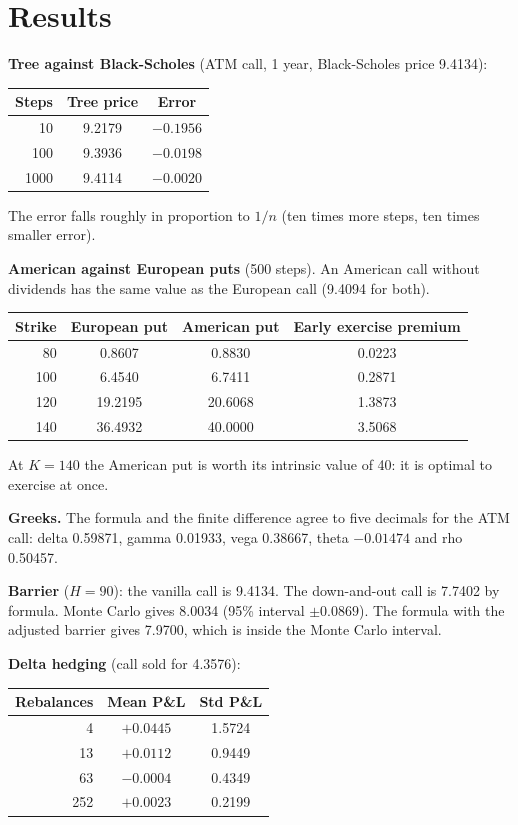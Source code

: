 \documentclass[11pt,a4paper]{article}
\begin{document}
\section{Results}
\textbf{Tree against Black-Scholes} (ATM call, 1 year, Black-Scholes price 9.4134):

\begin{center}
\begin{tabular}{@{}rcc@{}}
\toprule
Steps & Tree price & Error \\
\midrule
10 & 9.2179 & $-0.1956$ \\
100 & 9.3936 & $-0.0198$ \\
1000 & 9.4114 & $-0.0020$ \\
\bottomrule
\end{tabular}
\end{center}
The error falls roughly in proportion to $1/n$ (ten times more steps, ten times smaller error).

\textbf{American against European puts} (500 steps). An American call without dividends has the same value as the European call (9.4094 for both).

\begin{center}
\begin{tabular}{@{}rccc@{}}
\toprule
Strike & European put & American put & Early exercise premium \\
\midrule
80 & 0.8607 & 0.8830 & 0.0223 \\
100 & 6.4540 & 6.7411 & 0.2871 \\
120 & 19.2195 & 20.6068 & 1.3873 \\
140 & 36.4932 & 40.0000 & 3.5068 \\
\bottomrule
\end{tabular}
\end{center}
At $K=140$ the American put is worth its intrinsic value of 40: it is optimal to exercise at once.

\textbf{Greeks.} The formula and the finite difference agree to five decimals for the ATM call: delta 0.59871, gamma 0.01933, vega 0.38667, theta $-0.01474$ and rho 0.50457.

\textbf{Barrier} ($H=90$): the vanilla call is 9.4134. The down-and-out call is 7.7402 by formula. Monte Carlo gives 8.0034 (95\% interval $\pm0.0869$). The formula with the adjusted barrier gives 7.9700, which is inside the Monte Carlo interval.

\textbf{Delta hedging} (call sold for 4.3576):

\begin{center}
\begin{tabular}{@{}rcc@{}}
\toprule
Rebalances & Mean P\&L & Std P\&L \\
\midrule
4 & $+0.0445$ & 1.5724 \\
13 & $+0.0112$ & 0.9449 \\
63 & $-0.0004$ & 0.4349 \\
252 & $+0.0023$ & 0.2199 \\
\bottomrule
\end{tabular}
\end{center}
\end{document}
